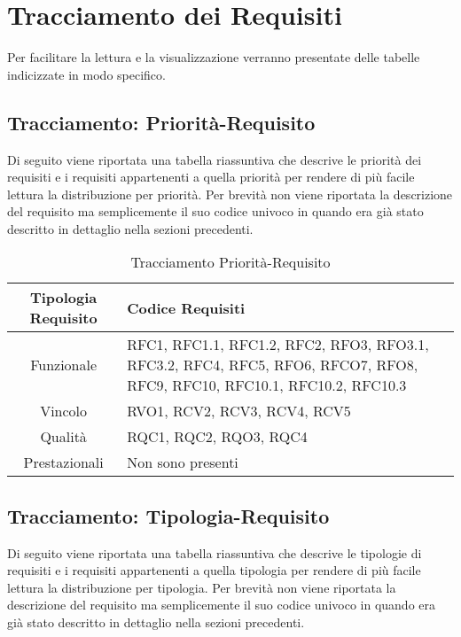 \section{Tracciamento dei Requisiti}
Per facilitare la lettura e la visualizzazione verranno presentate delle tabelle indicizzate in modo specifico.

\subsection{Tracciamento: Priorità-Requisito}
Di seguito viene riportata una tabella riassuntiva che descrive le priorità dei requisiti e i requisiti appartenenti a quella priorità per rendere di più facile lettura la distribuzione per priorità.
Per brevità non viene riportata la descrizione del requisito ma semplicemente il suo codice univoco in quando era già stato descritto in dettaglio nella sezioni precedenti.   

\begin{table}[h!] %
            \centering
            \renewcommand{\arraystretch}{2} %
            \begin{tabular}{|c|p{10cm}|} %
                \rowcolor{orange!50} %
        		\hline
        		\textbf{Tipologia Requisito} & \textbf{Codice Requisiti} \\
                \hline
                Funzionale & RFC1, RFC1.1, RFC1.2, RFC2, RFO3, RFO3.1, RFC3.2, RFC4, RFC5, RFO6, RFCO7, RFO8, RFC9, RFC10, RFC10.1, RFC10.2, RFC10.3 \\
                \hline
                Vincolo & RVO1, RCV2, RCV3, RCV4, RCV5\\
                \hline
                Qualità & RQC1, RQC2, RQO3, RQC4\\
                \hline
                Prestazionali & Non sono presenti\\
                \hline
        \end{tabular}
        \caption{Tracciamento Priorità-Requisito} %
        \label{tab:Tracciamento Priorità-Requisito}
\end{table}


\subsection{Tracciamento: Tipologia-Requisito}
Di seguito viene riportata una tabella riassuntiva che descrive le tipologie di requisiti e i requisiti appartenenti a quella tipologia per rendere di più facile lettura la distribuzione per tipologia.
Per brevità non viene riportata la descrizione del requisito ma semplicemente il suo codice univoco in quando era già stato descritto in dettaglio nella sezioni precedenti.

